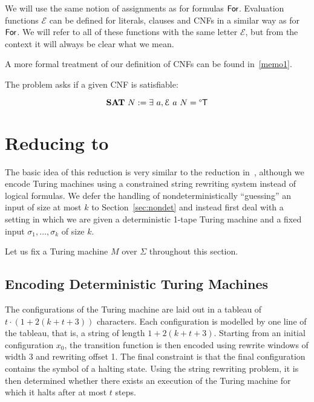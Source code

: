 \documentclass[a4paper,UKenglish,cleveref, autoref]{lipics-v2019}
\begin{document}
We will use the same notion of assignments as for formulas $\textsf{For}$. 
Evaluation functions $\mathcal{E}$ can be defined for literals, clauses and CNFs in a similar way as for $\textsf{For}$. We will refer to all of these functions with the same letter $\mathcal{E}$, but from the context it will always be clear what we mean.

A more formal treatment of our definition of CNFs can be found in~\ref{memo1}.

The problem \sat{} asks if a given CNF is satisfiable:
\begin{definition}
  \[\textbf{SAT}{}~N := \exists~a, \mathcal{E}~a~N = \degree\mathsf{T} \]
\end{definition}


\section{Reducing \gennp{} to \strconrew{}}
The basic idea of this reduction is very similar to the reduction in~\cite{Sipser:TheoryofComputation}, although we encode Turing machines using a constrained string rewriting system instead of logical formulas. We defer the handling of nondeterministically ``guessing'' an input of size at most $k$ to Section~\ref{sec:nondet} and instead first deal with a setting in which we are given a deterministic 1-tape Turing machine and a fixed input $\sigma_1, \ldots, \sigma_k$ of size $k$. 

Let us fix a Turing machine $M$ over $\Sigma$ throughout this section. 

\subsection{Encoding Deterministic Turing Machines}
The configurations of the Turing machine are laid out in a tableau of $t \cdot (1 + 2(k + t + 3))$ characters. Each configuration is modelled by one line of the tableau, that is, a string of length $1 + 2(k + t + 3)$. Starting from an initial configuration $x_0$, the transition function is then encoded using rewrite windows of width 3 and rewriting offset 1. The final constraint is that the final configuration contains the symbol of a halting state. 
Using the string rewriting problem, it is then determined whether there exists an execution of the Turing machine for which it halts after at most $t$ steps. 
\end{document}
